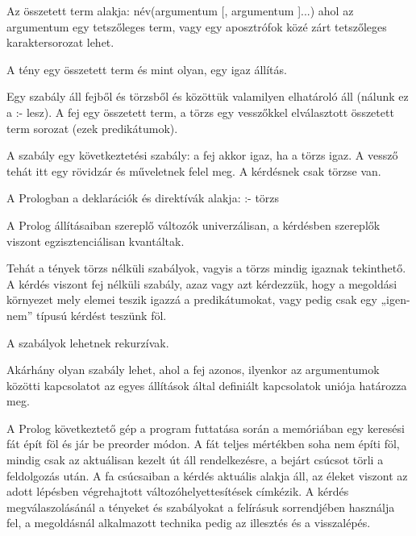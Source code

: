 Az összetett term alakja: név(argumentum [, argumentum ]...) ahol az argumentum egy tetszőleges term, vagy egy aposztrófok közé zárt tetszőleges karaktersorozat lehet. 

A tény egy összetett term és mint olyan, egy igaz állítás. 

Egy szabály áll fejből és törzsből és közöttük valamilyen elhatároló áll (nálunk ez a :- lesz). A fej egy összetett term, a törzs egy vesszőkkel elválasztott összetett term sorozat (ezek predikátumok). 

A szabály egy következtetési szabály: a fej akkor igaz, ha a törzs igaz. A vessző tehát itt egy rövidzár és műveletnek felel meg. A kérdésnek csak törzse van. 

A Prologban a deklarációk és direktívák alakja: :- törzs 

A Prolog állításaiban szereplő változók univerzálisan, a kérdésben szereplők viszont egzisztenciálisan kvantáltak. 

Tehát a tények törzs nélküli szabályok, vagyis a törzs mindig igaznak tekinthető. A kérdés viszont fej nélküli szabály, azaz vagy azt kérdezzük, hogy a megoldási környezet mely elemei teszik igazzá a predikátumokat, vagy pedig csak egy „igen-nem” típusú kérdést teszünk föl. 

A szabályok lehetnek rekurzívak. 

Akárhány olyan szabály lehet, ahol a fej azonos, ilyenkor az argumentumok közötti kapcsolatot az egyes állítások által definiált kapcsolatok uniója határozza meg. 

A Prolog következtető gép a program futtatása során a memóriában egy keresési fát épít föl és jár be preorder módon. A fát teljes mértékben soha nem építi föl, mindig csak az aktuálisan kezelt út áll rendelkezésre, a bejárt csúcsot törli a feldolgozás után. A fa csúcsaiban a kérdés aktuális alakja áll, az éleket viszont az adott lépésben végrehajtott változóhelyettesítések címkézik. A kérdés megválaszolásánál a tényeket és szabályokat a felírásuk sorrendjében használja fel, a megoldásnál alkalmazott technika pedig az illesztés és a visszalépés. 

